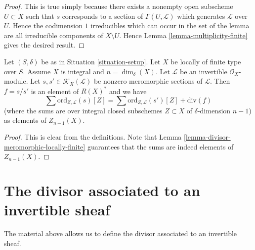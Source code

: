 \begin{proof}
This is true simply because there exists a nonempty open subscheme
$U \subset X$ such that $s$ corresponds to a section of
$\Gamma(U, \mathcal{L})$ which generates $\mathcal{L}$ over $U$.
Hence the codimension $1$
irreducibles which can occur in the set of the lemma are all
irreducible components of $X \setminus U$.
Hence Lemma \ref{lemma-multiplicity-finite} gives the desired result.
\end{proof}

\begin{lemma}
\label{lemma-divisor-meromorphic-well-defined}
Let $(S, \delta)$ be as in Situation \ref{situation-setup}.
Let $X$ be locally of finite type over $S$. Assume $X$ is
integral and $n = \dim_\delta(X)$.
Let $\mathcal{L}$ be an invertible $\mathcal{O}_X$-module.
Let $s, s' \in \mathcal{K}_X(\mathcal{L})$ be nonzero
meromorphic sections of $\mathcal{L}$. Then $f = s/s'$
is an element of $R(X)^*$ and we have
$$
\sum \text{ord}_{Z, \mathcal{L}}(s)[Z]
=
\sum \text{ord}_{Z, \mathcal{L}}(s')[Z]
+
\text{div}(f)
$$
(where the sums are over integral closed subschemes $Z \subset X$
of $\delta$-dimension $n - 1$) as elements of $Z_{n - 1}(X)$.
\end{lemma}

\begin{proof}
This is clear from the definitions.
Note that Lemma \ref{lemma-divisor-meromorphic-locally-finite}
guarantees that the sums are indeed
elements of $Z_{n - 1}(X)$.
\end{proof}









\section{The divisor associated to an invertible sheaf}
\label{section-divisor-invertible-sheaf}

\noindent
The material above allows us to define the divisor
associated to an invertible sheaf.


